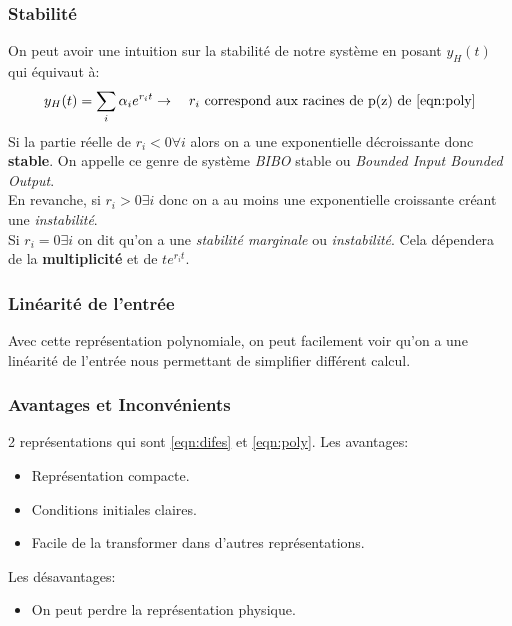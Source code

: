 \documentclass{report}
\begin{document}
\subsubsection{Stabilité}
On peut avoir une intuition sur la stabilité de notre système en posant $y_H(t)$ qui équivaut à:
\begin{equation}
y_H(t) = \sum_i \alpha_ie^{r_it} \rightarrow \quad r_i \text{ correspond aux racines de p(z) de \ref{eqn:poly}}
\end{equation}
Si la partie réelle de $r_i < 0 \forall i$ alors on a une exponentielle décroissante donc \textbf{stable}. On appelle ce genre de système \textit{BIBO} stable ou \textit{Bounded Input Bounded Output}.\\

En revanche, si $r_i > 0 \exists i$ donc on a au moins une exponentielle croissante créant une \textit{instabilité}.\\

Si $r_i = 0 \exists i$ on dit qu'on a une \textit{stabilité marginale} ou \textit{instabilité}. Cela dépendera de la \textbf{multiplicité} et de \textbf{$te^{r_it}$}.

\subsubsection{Linéarité de l'entrée}
Avec cette représentation polynomiale, on peut facilement voir qu'on a une linéarité de l'entrée nous permettant de simplifier différent calcul. %

\subsubsection{Avantages et Inconvénients}
2 représentations qui sont \ref{eqn:difes} et \ref{eqn:poly}. Les avantages:
\begin{itemize}
\item Représentation compacte.
\item Conditions initiales claires.
\item Facile de la transformer dans d'autres représentations.
\end{itemize}
Les désavantages:
\begin{itemize}
\item On peut perdre la représentation physique.
\end{itemize}
\end{document}
